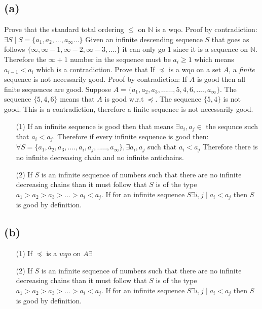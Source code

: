 \documentclass[12pt]{article}
\begin{document}
\subsection*{(a)}
Prove that the standard total ordering $\leq$ on $\mathbb{N}$ is a wqo.
\newline
\indent
Proof by contradiction: $\exists S \mid S = \{a_1, a_2, ... , a_\infty ...\}$
Given an infinite descending sequence $S$ that goes as follows
$\{\infty , \infty - 1, \infty -2, \infty-3, ....\}$ it can only go $1$
since it is a sequence on $\mathbb{N}$. Therefore the $\infty+1$ number in the
sequence must be $a_i \ge 1$ which means $a_{i-1} < a_i$
which is a contradiction.
\newline
Prove that If  $\preceq$ is a wqo on a set $A$, a {\it finite\/}
sequence is not  necessarily good.\newline
\indent Proof by contradiction:
If $A$ is good then all finite sequences are good.
Suppose $A = \{a_1 , a_2 , a_3 , ...... , 5 , 4 , 6 , .... , a_\infty\}$. 
The sequence $\{5,4,6\}$ means that $A$ is good w.r.t $\preceq$.
The sequence $\{5,4\}$ is not good.
This is a contradiction, therefore a finite sequence is not necessarily good.
\begin{enumerate}
\item[(1)]
If an infinite sequence is good then that means $\exists a_i,a_j \in$
the sequnce such that $a_i < a_j$. Therefore if every infinite sequence is
good then:
$\forall S = \{a_1 , a_2 , a_3 , .... , a_i , a_j , ..... , a_\infty\},
\exists a_i , a_j$ such that $a_i < a_j$
Therefore there is no infinite decreasing chain and no infinite antichains.
\item[(2)]
If $S$ is an infinite sequence of numbers such that there are no infinite
decreasing chains than it must follow that $S$ is of the type
$a_1 > a_2 > a_3 > ... > a_i < a_j$. If for an infinite sequence
$S \exists i , j \mid a_i < a_j$ then $S$ is good by definition.
\end{enumerate}
\subsection*{(b)}
\begin{enumerate}
\item[(1)]
If $\preceq$ is a $wqo$ on $A \exists $
\item[(2)]
If $S$ is an infinite sequence of numbers such that there are no
infinite decreasing chains than it must follow that $S$ is of the type
$a_1 > a_2 > a_3 > ... > a_i < a_j$.  If for an infinite sequence
$S \exists i , j \mid a_i < a_j$ then $S$ is good by definition.
\end{enumerate}
\end{document}
